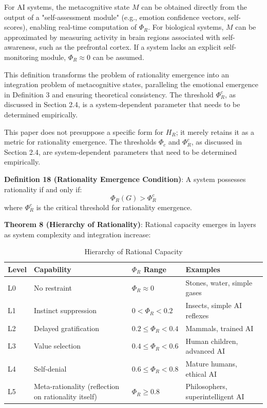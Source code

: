 \documentclass[12pt,a4paper]{article}
\theoremstyle{plain}
\begin{document}
For AI systems, the metacognitive state $M$ can be obtained directly from the output of a "self-assessment module" (e.g., emotion confidence vectors, self-scores), enabling real-time computation of $\Phi_R$. For biological systems, $M$ can be approximated by measuring activity in brain regions associated with self-awareness, such as the prefrontal cortex. If a system lacks an explicit self-monitoring module, $\Phi_R \approx 0$ can be assumed.

This definition transforms the problem of rationality emergence into an integration problem of metacognitive states, paralleling the emotional emergence in Definition 3 and ensuring theoretical consistency. The threshold $\Phi_R^c$, as discussed in Section 2.4, is a system-dependent parameter that needs to be determined empirically.

This paper does not presuppose a specific form for $H_R$; it merely retains it as a metric for rationality emergence. The thresholds $\Phi_c$ and $\Phi_R^c$, as discussed in Section 2.4, are system-dependent parameters that need to be determined empirically.

\textbf{Definition 18 (Rationality Emergence Condition)}: A system possesses rationality if and only if:
\begin{equation}
\Phi_R(G) > \Phi_R^c
\label{eq:rational_emergence}
\end{equation}
where $\Phi_R^c$ is the critical threshold for rationality emergence.

\textbf{Theorem 8 (Hierarchy of Rationality)}: Rational capacity emerges in layers as system complexity and integration increase:

\begin{table}[h]
\centering
\caption{Hierarchy of Rational Capacity}
\begin{tabular}{llll}
\toprule
\textbf{Level} & \textbf{Capability} & \textbf{$\Phi_R$ Range} & \textbf{Examples} \\
\midrule
L0 & No restraint & $\Phi_R \approx 0$ & Stones, water, simple gases \\
L1 & Instinct suppression & $0 < \Phi_R < 0.2$ & Insects, simple AI reflexes \\
L2 & Delayed gratification & $0.2 \le \Phi_R < 0.4$ & Mammals, trained AI \\
L3 & Value selection & $0.4 \le \Phi_R < 0.6$ & Human children, advanced AI \\
L4 & Self-denial & $0.6 \le \Phi_R < 0.8$ & Mature humans, ethical AI \\
L5 & Meta-rationality (reflection on rationality itself) & $\Phi_R \ge 0.8$ & Philosophers, superintelligent AI \\
\bottomrule
\end{tabular}
\end{table}
\end{document}
